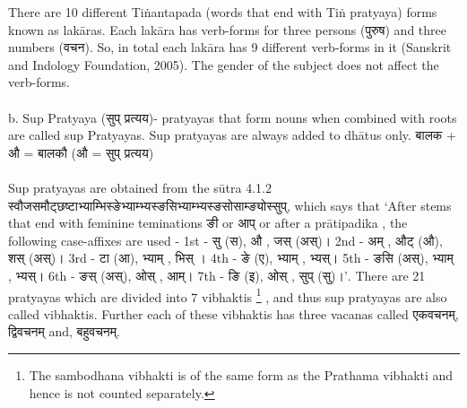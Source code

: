 There are 10 different Tiṅantapada (words that end with Tiṅ pratyaya) forms known as lakāras. Each lakāra has verb-forms for three persons (\texthindi{पुरुष}) and three numbers\texthindi{ (वचन). }So, in total each lakāra has 9 different verb-forms in it (Sanskrit and Indology Foundation, 2005). The gender of the subject does not affect the verb-forms.\\\\
b.	Sup Pratyaya \texthindi{(सुप् प्रत्यय)}- pratyayas that form nouns when combined with roots are called sup Pratyayas. Sup pratyayas are always added to dhātus only.\texthindi{
	बालक + औ = बालकौ (औ = सुप् प्रत्यय)
}\\\\
Sup pratyayas are obtained from the sūtra 4.1.2 \texthindi{ स्वौजसमौट्छष्टाभ्याम्भिस्ङेभ्याम्भ्यस्ङसिभ्याम्भ्यस्ङसोसाम्ङ्योस्सुप्}, which says that ‘After stems that end with feminine teminations ङी or आप् or after a  prātipadika , the following case-affixes are used - 1st - \texthindi{सु (स), औ , जस् (अस्)। }2nd - \texthindi{अम् , औट् (औ), शस् (अस्)।} 3rd \texthindi{- टा (आ), भ्याम् , भिस्} । 4th\texthindi{ - ङे (ए), भ्याम् , भ्यस्। }5th - \texthindi{ङसि (अस्), भ्याम् , भ्यस्}। \texthindi{6th - ङस् (अस्), ओस् , आम्।} 7th -\texthindi{ ङि (इ), ओस् , सुप् (सु)।’}.
There are 21 pratyayas which are divided into 7 vibhaktis \footnote{The sambodhana vibhakti is of the same form as the Prathama vibhakti and hence is not counted separately.} , and thus sup pratyayas are also called vibhaktis. Further each of these vibhaktis has three vacanas called \texthindi{एकवचनम्, द्विवचनम्} and,\texthindi{ बहुवचनम्.}

